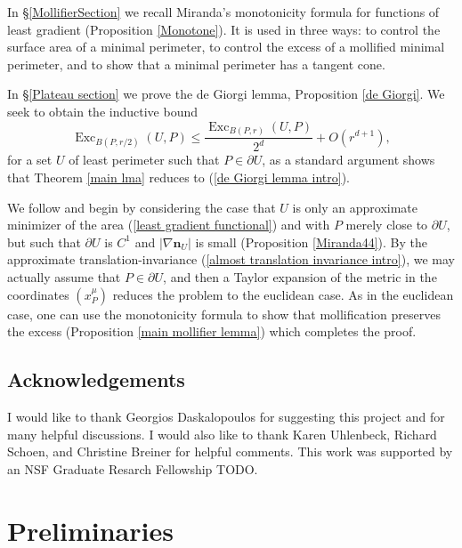 \documentclass[reqno,11pt]{amsart}
\DeclareMathOperator{\Exc}{Exc}
\newcommand{\normal}{\mathbf n}
\theoremstyle{definition}
\numberwithin{equation}{section}
\begin{document}
In \S\ref{MollifierSection} we recall Miranda's monotonicity formula \cite[Teorema 3.2]{Miranda66} for functions of least gradient (Proposition \ref{Monotone}).
It is used in three ways: to control the surface area of a minimal perimeter, to control the excess of a mollified minimal perimeter, and to show that a minimal perimeter has a tangent cone.

In \S\ref{Plateau section} we prove the de Giorgi lemma, Proposition \ref{de Giorgi}.
We seek to obtain the inductive bound
\begin{equation}\label{de Giorgi lemma intro}
\Exc_{B(P, r/2)}(U, P) \leq \frac{\Exc_{B(P, r)}(U, P)}{2^d} + O(r^{d + 1}),
\end{equation}
for a set $U$ of least perimeter such that $P \in \partial U$, as a standard argument shows that Theorem \ref{main lma} reduces to (\ref{de Giorgi lemma intro}).

We follow \cite[Chapters 6-7]{Giusti77} and begin by considering the case that $U$ is only an approximate minimizer of the area (\ref{least gradient functional}) and with $P$ merely close to $\partial U$, but such that $\partial U$ is $C^1$ and $|\nabla \normal_U|$ is small (Proposition \ref{Miranda44}).
By the approximate translation-invariance (\ref{almost translation invariance intro}), we may actually assume that $P \in \partial U$, and then a Taylor expansion of the metric in the coordinates $(x^\mu_P)$ reduces the problem to the euclidean case.
As in the euclidean case, one can use the monotonicity formula to show that mollification preserves the excess (Proposition \ref{main mollifier lemma}) which completes the proof.



\subsection{Acknowledgements}
I would like to thank Georgios Daskalopoulos for suggesting this project and for many helpful discussions.
I would also like to thank Karen Uhlenbeck, Richard Schoen, and Christine Breiner for helpful comments.
This work was supported by an NSF Graduate Resarch Fellowship TODO.



\section{Preliminaries}\label{Prelims}
\end{document}
